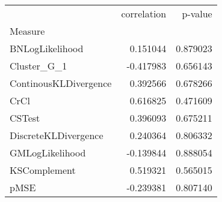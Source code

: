 \begin{tabular}{lrr}
\toprule
{} &  correlation &   p-value \\
Measure               &              &           \\
\midrule
BNLogLikelihood       &     0.151044 &  0.879023 \\
Cluster\_G\_1           &    -0.417983 &  0.656143 \\
ContinousKLDivergence &     0.392566 &  0.678266 \\
CrCl                  &     0.616825 &  0.471609 \\
CSTest                &     0.396093 &  0.675211 \\
DiscreteKLDivergence  &     0.240364 &  0.806332 \\
GMLogLikelihood       &    -0.139844 &  0.888054 \\
KSComplement          &     0.519321 &  0.565015 \\
pMSE                  &    -0.239381 &  0.807140 \\
\bottomrule
\end{tabular}
